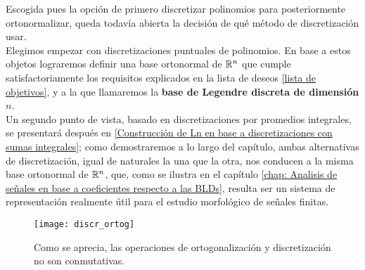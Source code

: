 Escogida pues la opción de primero 
discretizar polinomios para posteriormente
ortonormalizar, queda todavía abierta
la decisión de qué método de discretización usar. \\

Elegimos empezar
con discretizaciones puntuales de polinomios.
En base a estos objetos lograremos definir
una base ortonormal de $\mathbb{R}^{n}$ que cumple satisfactoriamente
los requisitos explicados en la lista de deseos
\ref{lista de objetivos}, y a la que llamaremos
la \textbf{base de Legendre discreta de dimensión $n$}. \\

Un segundo punto de vista, basado
en discretizaciones por promedios integrales,
se presentará después en
\ref{Construcción de Ln en base a discretizaciones con sumas integrales}; 
como demostraremos a lo largo del capítulo, 
ambas alternativas
de discretización, igual de naturales la una que la otra, nos
conducen a la misma base ortonormal de $\mathbb{R}^{n}$,
que, como se ilustra en el capítulo 
\ref{chap: Analisis de señales en base a coeficientes respecto a las BLDs},
resulta ser un sistema de representación
realmente útil para el estudio morfológico de señales finitas.

\newpage %

\begin{figure}[H]
\centering\captionsetup{format = hang}
	\begin{measuredfigure}
		\label{fig: ortogonalizacion, discretizacion}
		\texttt{[image: discr\_ortog]} 
		\caption{Como se aprecia, las operaciones de
		ortogonalización y discretización no son conmutativas.}
 	\end{measuredfigure}
 \end{figure}